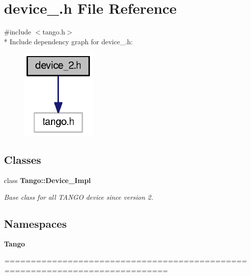 \section{device\-\_.\-h File Reference}
\label{device__2_8h}
{\ttfamily \#include $<$tango.\-h$>$}\\*
Include dependency graph for device\-\_.\-h\-:
\nopagebreak
\begin{figure}[H]
\begin{center}
\leavevmode
\includegraphics[width=106pt]{d9/d14/device__2_8h__incl}
\end{center}
\end{figure}
\subsection*{Classes}
\begin{DoxyCompactItemize}
\item 
class {\bf Tango\-::\-Device\-\_\-Impl}
\begin{DoxyCompactList}\small\item\em Base class for all T\-A\-N\-G\-O device since version 2. \end{DoxyCompactList}\end{DoxyCompactItemize}
\subsection*{Namespaces}
\begin{DoxyCompactItemize}
\item 
{\bf Tango}
\begin{DoxyCompactList}\small\item\em ============================================================================= \end{DoxyCompactList}\end{DoxyCompactItemize}
